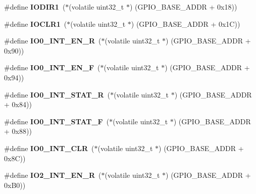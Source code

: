 \begin{DoxyCompactItemize}
\item 
\mbox{\label{group__lpc24xx__regs_ga44e84c559a5497e4711e141d5a8e937c}} 
\#define {\bfseries I\+O\+D\+I\+R1}~($\ast$(volatile uint32\+\_\+t $\ast$) (G\+P\+I\+O\+\_\+\+B\+A\+S\+E\+\_\+\+A\+D\+DR + 0x18))
\item 
\mbox{\label{group__lpc24xx__regs_ga23d17def1b57a0912085f27bbce2b330}} 
\#define {\bfseries I\+O\+C\+L\+R1}~($\ast$(volatile uint32\+\_\+t $\ast$) (G\+P\+I\+O\+\_\+\+B\+A\+S\+E\+\_\+\+A\+D\+DR + 0x1\+C))
\item 
\mbox{\label{group__lpc24xx__regs_gac2b14f92eab4bbacd775af479d7cfdd3}} 
\#define {\bfseries I\+O0\+\_\+\+I\+N\+T\+\_\+\+E\+N\+\_\+R}~($\ast$(volatile uint32\+\_\+t $\ast$) (G\+P\+I\+O\+\_\+\+B\+A\+S\+E\+\_\+\+A\+D\+DR + 0x90))
\item 
\mbox{\label{group__lpc24xx__regs_ga2208381949194e24420c9d584eea88e4}} 
\#define {\bfseries I\+O0\+\_\+\+I\+N\+T\+\_\+\+E\+N\+\_\+F}~($\ast$(volatile uint32\+\_\+t $\ast$) (G\+P\+I\+O\+\_\+\+B\+A\+S\+E\+\_\+\+A\+D\+DR + 0x94))
\item 
\mbox{\label{group__lpc24xx__regs_ga313880e4c3cede17ff2015ab2220ad5e}} 
\#define {\bfseries I\+O0\+\_\+\+I\+N\+T\+\_\+\+S\+T\+A\+T\+\_\+R}~($\ast$(volatile uint32\+\_\+t $\ast$) (G\+P\+I\+O\+\_\+\+B\+A\+S\+E\+\_\+\+A\+D\+DR + 0x84))
\item 
\mbox{\label{group__lpc24xx__regs_ga08c3000f2dc23099e6ab9c6bb57376a7}} 
\#define {\bfseries I\+O0\+\_\+\+I\+N\+T\+\_\+\+S\+T\+A\+T\+\_\+F}~($\ast$(volatile uint32\+\_\+t $\ast$) (G\+P\+I\+O\+\_\+\+B\+A\+S\+E\+\_\+\+A\+D\+DR + 0x88))
\item 
\mbox{\label{group__lpc24xx__regs_ga1fddaca6d2c33db9df5cf5843e24ff6b}} 
\#define {\bfseries I\+O0\+\_\+\+I\+N\+T\+\_\+\+C\+LR}~($\ast$(volatile uint32\+\_\+t $\ast$) (G\+P\+I\+O\+\_\+\+B\+A\+S\+E\+\_\+\+A\+D\+DR + 0x8\+C))
\item 
\mbox{\label{group__lpc24xx__regs_ga366c6c71bcd778d269d488f611d90ac1}} 
\#define {\bfseries I\+O2\+\_\+\+I\+N\+T\+\_\+\+E\+N\+\_\+R}~($\ast$(volatile uint32\+\_\+t $\ast$) (G\+P\+I\+O\+\_\+\+B\+A\+S\+E\+\_\+\+A\+D\+DR + 0x\+B0))

\end{DoxyCompactItemize}
